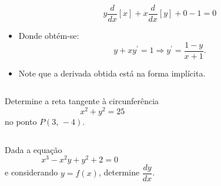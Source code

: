 \begin{frame}
\begin{columns}[onlytextwidth]
\begin{column}{0.49\textwidth}
\begin{itemize}
        \begin{equation*}
          y\frac{d}{dx}\left[x\right] + x\frac{d}{dx}\left[y\right] + 0 - 1 = 0
        \end{equation*}
        \item Donde obtém-se:
        \begin{equation*}
          y + xy^{\prime} = 1 \Rightarrow y^{\prime} = \frac{1-y}{x+1}.
        \end{equation*}
        \item Note que a derivada obtida está na forma implícita.
      \end{itemize}
    \end{column}
  \end{columns}
\end{frame}

\begin{frame}
  \begin{columns}[onlytextwidth]
    \begin{column}{0.5\textwidth}\vspace*{-0.5cm}
      \begin{example}
        Determine a reta tangente à circunferência
        \begin{equation*}
          x^{2} + y^{2} = 25
        \end{equation*}
        no ponto $P(3,\,-4)$.
      \end{example}
    \end{column}
    \begin{column}{0.5\textwidth}
      \begin{figure}
      \end{figure}
    \end{column}
  \end{columns}
\end{frame}

\begin{frame}
  \begin{columns}[onlytextwidth]
    \vspace*{-0.5cm}
      \begin{example}
        Dada a equação $$x^3-x^2y + y^2 + 2 = 0$$ e considerando $y=f(x)$, determine $\dfrac{dy}{dx}$.
      \end{example}
    \hfill
  \end{columns}
\end{frame}

